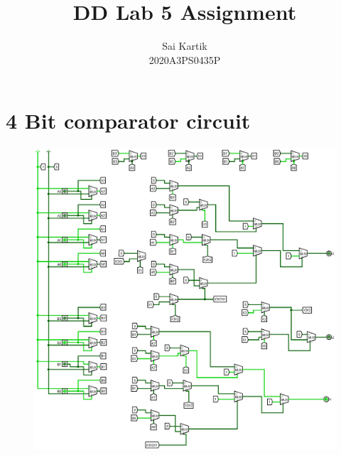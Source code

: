 \documentclass[12pt]{article}
\title{DD Lab 5 Assignment}
\author{Sai Kartik \\2020A3PS0435P}
\begin{document}
\maketitle
\section*{4 Bit comparator circuit}
\begin{center}
    \begin{figure}[ht]
        \includegraphics[scale=0.30]{4bit.png}
    \end{figure}
\end{center}
\end{document}
